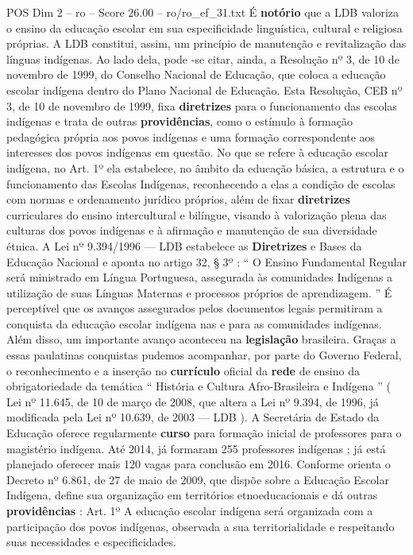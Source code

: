 \begin{textsample}{POS Dim 2 – ro – Score 26.00 – ro/ro\_ef\_31.txt}  \label{ex:f2_pos_188}
É \textbf{notório} que a LDB valoriza o ensino da educação escolar em sua especificidade linguística, cultural e religiosa próprias.
A LDB constitui, assim, um princípio de manutenção e revitalização das línguas indígenas.
Ao lado dela, pode -se citar, ainda, a Resolução nº 3, de 10 de novembro de 1999, do Conselho Nacional de Educação, que coloca a educação escolar indígena dentro do Plano Nacional de Educação.
Esta Resolução, CEB nº 3, de 10 de novembro de 1999, fixa \textbf{diretrizes} para o funcionamento das escolas indígenas e trata de outras \textbf{providências}, como o estímulo à formação pedagógica própria aos povos indígenas e uma formação correspondente aos interesses dos povos indígenas em questão.
No que se refere à educação escolar indígena, no Art. 1º ela estabelece, no âmbito da educação básica, a estrutura e o funcionamento das Escolas Indígenas, reconhecendo a elas a condição de escolas com normas e ordenamento jurídico próprios, além de fixar \textbf{diretrizes} curriculares do ensino intercultural e bilíngue, visando à valorização plena das culturas dos povos indígenas e à afirmação e manutenção de sua diversidade étnica.
A Lei nº 9.394/1996 — LDB estabelece as \textbf{Diretrizes} e Bases da Educação Nacional e aponta no artigo 32, § 3º : “ O Ensino Fundamental Regular será ministrado em Língua Portuguesa, assegurada às comunidades Indígenas a utilização de suas Línguas Maternas e processos próprios de aprendizagem. ” É perceptível que os avanços assegurados pelos documentos legais permitiram a conquista da educação escolar indígena nas e para as comunidades indígenas.
Além disso, um importante avanço aconteceu na \textbf{legislação} brasileira.
Graças a essas paulatinas conquistas pudemos acompanhar, por parte do Governo Federal, o reconhecimento e a inserção no \textbf{currículo} oficial da \textbf{rede} de ensino da obrigatoriedade da temática “ História e Cultura Afro-Brasileira e Indígena ” ( Lei nº 11.645, de 10 de março de 2008, que altera a Lei nº 9.394, de 1996, já modificada pela Lei nº 10.639, de 2003 — LDB ).
A Secretária de Estado da Educação oferece regularmente \textbf{curso} para formação inicial de professores para o magistério indígena.
Até 2014, já formaram 255 professores indígenas ; já está planejado oferecer mais 120 vagas para conclusão em 2016.
Conforme orienta o Decreto nº 6.861, de 27 de maio de 2009, que dispõe sobre a Educação Escolar Indígena, define sua organização em territórios etnoeducacionais e dá outras \textbf{providências} : Art. 1º A educação escolar indígena será organizada com a participação dos povos indígenas, observada a sua territorialidade e respeitando suas necessidades e especificidades.

\end{textsample}
